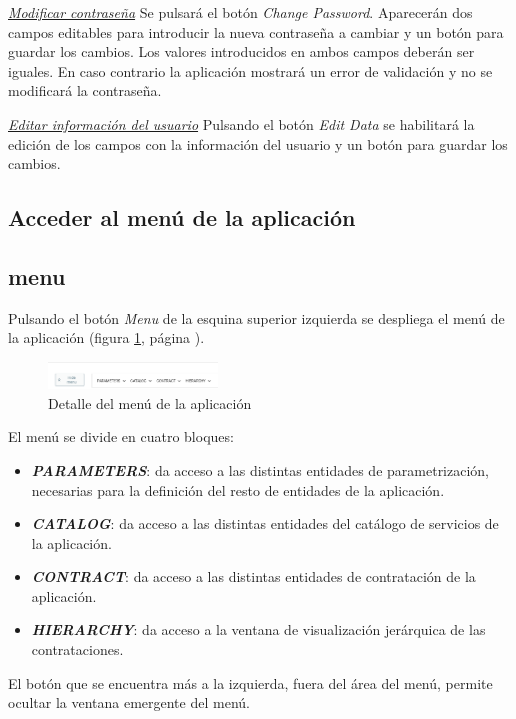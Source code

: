 \underline{\textsl{Modificar contraseña}}
Se pulsará el botón \emph{Change Password}. Aparecerán dos campos editables para introducir la nueva contraseña a cambiar y un botón para guardar los cambios. Los valores introducidos en ambos campos deberán ser iguales. En caso contrario la aplicación mostrará un error de validación y no se modificará la contraseña.

\underline{\textsl{Editar información del usuario}}
Pulsando el botón \emph{Edit Data} se habilitará la edición de los campos con la información del usuario y un botón para guardar los cambios.


\subsection{Acceder al menú de la aplicación}
\subsection{menu}
Pulsando el botón \emph{Menu} de la esquina superior izquierda se despliega el menú de la aplicación (figura \ref{fig:menu}, página \pageref{fig:menu}).

\begin{figure}[H]
  \centering
  \includegraphics[width=0.40\textwidth]{imaxes/menu-aplicacion.png}
  \caption{Detalle del menú de la aplicación}
  \label{fig:menu}
\end{figure}

El menú se divide en cuatro bloques:

\begin{itemize}
\item \emph{\textbf{PARAMETERS}}: da acceso a las distintas entidades de parametrización, necesarias para la definición del resto de entidades de la aplicación.
\item \emph{\textbf{CATALOG}}: da acceso a las distintas entidades del catálogo de servicios de la aplicación.
\item \emph{\textbf{CONTRACT}}: da acceso a las distintas entidades de contratación de la aplicación.
\item \emph{\textbf{HIERARCHY}}: da acceso a la ventana de visualización jerárquica de las contrataciones.
\end{itemize}

El botón que se encuentra más a la izquierda, fuera del área del menú, permite ocultar la ventana emergente del menú.


